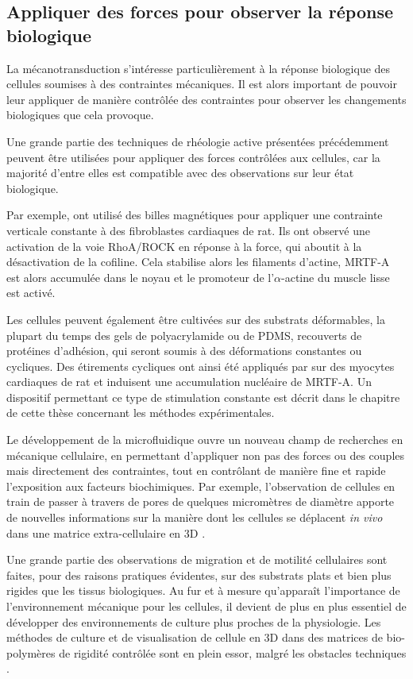 \subsection{Appliquer des forces pour observer la réponse biologique}

La mécanotransduction s'intéresse particulièrement à la réponse biologique des cellules soumises à des contraintes mécaniques. 
Il est alors important de pouvoir leur appliquer de manière contrôlée des contraintes pour observer les changements biologiques que cela provoque. 

Une grande partie des techniques de rhéologie active présentées précédemment peuvent être utilisées pour appliquer des forces contrôlées aux cellules, car la majorité d'entre elles est compatible avec des observations sur leur état biologique.

Par exemple, \cite{zhao_force_2007} ont utilisé des billes magnétiques pour appliquer une contrainte verticale constante à des fibroblastes cardiaques de rat. Ils ont observé une activation de la voie RhoA/ROCK en réponse à la force, qui aboutit à la désactivation de la cofiline. Cela stabilise alors les filaments d'actine, MRTF-A est alors accumulée dans le noyau et le promoteur de l'$\alpha$-actine  du muscle lisse est activé. 

Les cellules peuvent également être cultivées sur des substrats déformables, la plupart du temps des gels de polyacrylamide ou de PDMS, recouverts de protéines d'adhésion, qui seront soumis à des déformations constantes ou cycliques. Des étirements cycliques ont ainsi été appliqués par \cite{kuwahara_myocardin-related_2010} sur des myocytes cardiaques de rat et induisent une accumulation nucléaire de MRTF-A. 
Un dispositif permettant ce type de stimulation constante est décrit dans le chapitre de cette thèse concernant les méthodes expérimentales.  


Le développement de la microfluidique ouvre un nouveau champ de recherches en mécanique cellulaire, en permettant d'appliquer non pas des forces ou des couples mais directement des contraintes, tout en contrôlant de manière fine et rapide l'exposition aux facteurs biochimiques. 
Par exemple, l'observation de cellules en train de passer à travers de pores de quelques micromètres de diamètre apporte de nouvelles informations sur la manière dont les cellules se déplacent \textit{in vivo} dans une matrice extra-cellulaire en 3D \parencite{aubry_computational_2015}. 

Une grande partie des observations de migration et de motilité cellulaires sont faites, pour des raisons pratiques évidentes, sur des substrats plats et bien plus rigides que les tissus biologiques. Au fur et à mesure qu'apparaît l'importance de l'environnement mécanique pour les cellules, il devient de plus en plus essentiel de développer des environnements de culture plus proches de la physiologie. Les méthodes de culture et de visualisation de cellule en 3D dans des matrices de bio-polymères de rigidité contrôlée sont en plein essor, malgré les obstacles techniques \parencite{fischer_stiffness-controlled_2012}. 

%

